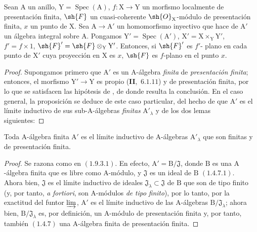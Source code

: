 \begin{proposition}[11.5.5]
\label{IV.11.5.5}
Sean $\mathrm{A}$ un anillo, $\mathrm{Y}=\operatorname{Spec}(\mathrm{A})$, $f:\mathrm{X}\to\mathrm{Y}$ un morfismo
localmente de presentación finita, $\sh{F}$ un cuasi-coherente $\sh{O}_\mathrm{X}$-módulo de presentación finita, $x$ un punto
de $\mathrm{X}$. Sea $\mathrm{A}\to\mathrm{A}'$ un homomorfismo inyectivo que hace de $\mathrm{A}'$ un álgebra integral sobre $\mathrm{A}$. Pongamos
$\mathrm{Y}'=\operatorname{Spec}(\mathrm{A}')$, $\mathrm{X}'=\mathrm{X}\times_\mathrm{Y}\mathrm{Y}'$, $f'=f\times 1$, $\sh{F}'=\sh{F}\otimes_\mathrm{Y}\mathrm{Y}'$. Entonces, si $\sh{F}'$ es $f'$- plano en cada punto
de $\mathrm{X}'$ cuya proyección en $\mathrm{X}$ es $x$, $\sh{F}$ es $f$-plano en el punto $x$.
\end{proposition}

\begin{proof}
Supongamos primero que $\mathrm{A}'$ es un $\mathrm{A}$-álgebra \emph{finita} de \emph{presentación finita}; entonces, el
morfismo $\mathrm{Y}'\to\mathrm{Y}$ es propio (\textbf{II},~$6.1.11$) y de presentación finita, por lo que se satisfacen las hipótesis
de , de donde resulta la conclusión. En el caso general, la proposición se deduce
de este caso particular, del hecho de que $\mathrm{A}'$ es el límite inductivo de sus sub-$\mathrm{A}$-álgebras \emph{finitas}
$\mathrm{A}'_\lambda$ y de los dos lemas siguientes:
\end{proof}

\begin{lemma}[11.5.5.1]
\label{IV.11.5.5.1}
Toda $\mathrm{A}$-álgebra finita $\mathrm{A}'$ es el límite inductivo de $\mathrm{A}$-álgebras $\mathrm{A}'_\lambda$
que son finitas y de presentación finita.
\end{lemma}

\begin{proof}
Se razona como en $(1.9.3.1)$. En efecto, $\mathrm{A}'=\mathrm{B}/\mathfrak{J}$, donde $\mathrm{B}$ es una $\mathrm{A}$-álgebra finita
que es libre como $\mathrm{A}$-módulo, y $\mathfrak{J}$ es un ideal de $\mathrm{B}$ $(1.4.7.1)$. Ahora bien, $\mathfrak{J}$ es el
límite inductivo de ideales $\mathfrak{J}_\lambda\subset\mathfrak{J}$ de $\mathrm{B}$ que son de tipo finito (y, por tanto, \emph{a fortiori}, son $\mathrm{A}$-módulos \emph{de tipo finito}),
por lo tanto,
por la exactitud del funtor $\varinjlim$, $\mathrm{A}'$ es el límite inductivo de las $\mathrm{A}$-álgebras $\mathrm{B}/\mathfrak{J}_\lambda$; ahora bien, $\mathrm{B}/\mathfrak{J}_\lambda$
es, por definición, un $\mathrm{A}$-módulo de presentación finita y, por tanto, también $(1.4.7)$ una $\mathrm{A}$-álgebra finita
de presentación finita.
\end{proof}

